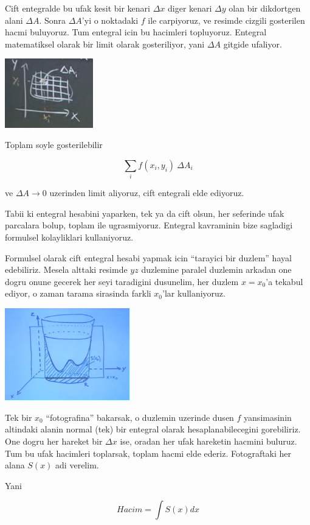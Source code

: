 \documentclass[12pt,fleqn]{article}\usepackage{../common}
\begin{document}
Cift entegralde bu ufak kesit bir kenari $\Delta x$ diger kenari $\Delta y$ olan
bir dikdortgen alani $\Delta A$. Sonra $\Delta A$'yi o noktadaki $f$ ile
carpiyoruz, ve resimde cizgili gosterilen hacmi buluyoruz. Tum entegral icin
bu hacimleri topluyoruz. Entegral matematiksel olarak bir limit olarak
gosteriliyor, yani $\Delta A$ gitgide ufaliyor. 

\includegraphics[height=3cm]{16_4.png}

Toplam soyle gosterilebilir

\[ \sum_i f(x_i,y_i) \ \Delta A_i \]

ve $\Delta A \to 0$ uzerinden limit aliyoruz, cift entegrali elde ediyoruz. 

Tabii ki entegral hesabini yaparken, tek ya da cift olsun, her seferinde
ufak parcalara bolup, toplam ile ugrasmiyoruz. Entegral kavraminin bize
sagladigi formulsel kolayliklari kullaniyoruz.

Formulsel olarak cift entegral hesabi yapmak icin ``tarayici bir
duzlem'' hayal edebiliriz. Mesela alttaki resimde $yz$ duzlemine paralel
duzlemin arkadan one dogru onune gecerek her seyi taradigini dusunelim, her
duzlem $x=x_0$'a tekabul ediyor, o zaman tarama sirasinda farkli $x_0$'lar
kullaniyoruz.

\includegraphics[height=4cm]{16_5.png}

Tek bir $x_0$ ``fotografina'' bakarsak, o duzlemin uzerinde dusen $f$
yansimasinin altindaki alanin normal (tek) bir entegral olarak
hesaplanabilecegini gorebiliriz. One dogru her hareket bir $\Delta x$ ise,
oradan her ufak hareketin hacmini buluruz. Tum bu ufak hacimleri toplarsak,
toplam hacmi elde ederiz. Fotograftaki her alana $S(x)$ adi verelim.

Yani 

\[ Hacim = \int S(x) dx \]
\end{document}
